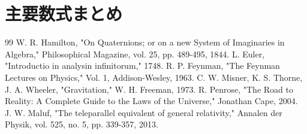 \documentclass[dvipdfmx,a4paper]{jsbook}
\theoremstyle{definition}
\theoremstyle{remark}
\begin{document}
\renewcommand{\arraystretch}{1}
\restoregeometry

\chapter{主要数式まとめ}


\begin{thebibliography}{99}
 W. R. Hamilton, "On Quaternions; or on a new System of Imaginaries in Algebra," Philosophical Magazine, vol. 25, pp. 489-495, 1844.
 L. Euler, "Introductio in analysin infinitorum," 1748.
 R. P. Feynman, "The Feynman Lectures on Physics," Vol. 1, Addison-Wesley, 1963.
 C. W. Misner, K. S. Thorne, J. A. Wheeler, "Gravitation," W. H. Freeman, 1973.
 R. Penrose, "The Road to Reality: A Complete Guide to the Laws of the Universe," Jonathan Cape, 2004.
 J. W. Maluf, "The teleparallel equivalent of general relativity," Annalen der Physik, vol. 525, no. 5, pp. 339-357, 2013.
\end{thebibliography}
\end{document}
